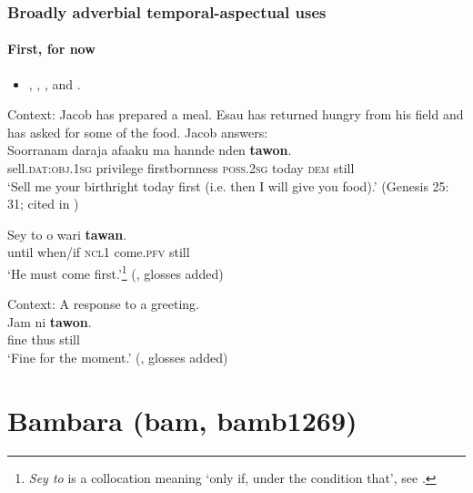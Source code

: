 \subsubsection{Broadly adverbial temporal-aspectual uses}

\paragraph{First, for now}\label{appendixAdamawaFirst}
\begin{itemize}
	\item \textcite[54, 387, 435, 452]{Kingenheben1963}, \textcite{Kramer2021Adamawa}, \textcite[63]{Taylor1953}, \textcite[177]{Labatut1982} and \textcite[s.v. \textit{first}]{deWolf1995}.
\end{itemize}

\begin{exe}
	\ex
	Context: Jacob has prepared a meal. Esau has returned hungry from his field and has asked for some of the food. Jacob answers:\\
	\gll Soorranam daraja afaaku ma hannde nden \textbf{tawon}.\\
	sell.\textsc{dat}:\textsc{obj}.1\textsc{sg} privilege firstbornness \textsc{poss}.2\textsc{sg} today \textsc{dem} still\\
	\glt \lq Sell me your birthright today first (i.e. then I will give you food).' (Genesis 25: 31; cited in \cite[250]{Kramer2021Adamawa})

	\ex
	\gll Sey to o wari \textbf{tawan}.\\
	until when/if \textsc{ncl}1 come.\textsc{pfv} still\\
	\glt \lq He must come first.'\footnote{\textit{Sey to} is a collocation meaning \lq only if, under the condition that', see \textcite[s.v. \textit{condition}]{deWolf1995}.} (\cite[s.v. \textit{first}]{deWolf1995}, glosses added)
	
	\ex Context: A response to a greeting.\\
	\gll Jam ni \textbf{tawon}.\\
	fine thus still\\
	\glt \lq Fine for the moment.\rq{ }(\cite[187–188]{PelletierSkinner1981}, glosses added)
\end{exe}

\section{Bambara (bam, bamb1269)}
\label{appendixBambara} 

